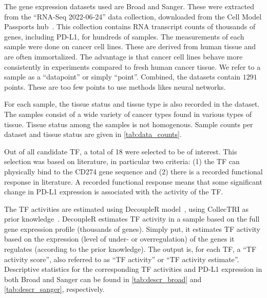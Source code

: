 The gene expression datasets used are Broad and Sanger.
These were extracted from the ``RNA-Seq 2022-06-24'' data collection,
downloaded from the Cell Model Passports hub~\cite{van_der_meer_cell_2019, noauthor_cell_nodate}.
This collection contains RNA transcript counts of thousands of genes, including PD-L1, for hundreds of samples.
The measurements of each sample were done on cancer cell lines.
These are derived from human tissue and are often immortalized.
The advantage is that cancer cell lines behave more consistently in experiments compared to fresh human cancer tissue.
We refer to a sample as a ``datapoint'' or simply ``point''.
Combined, the datasets contain $1291$ points.
These are too few points to use methods likes neural networks.

For each sample, the tissue status and tissue type is also recorded in the dataset.
The samples consist of a wide variety of cancer types found in various types of tissue.
Tissue status among the samples is not homogenous.
Sample counts per dataset and tissue status are given in \autoref{tab:data_counts}.

\begin{table}[h]
    \centering
    
    \caption{Sample counts by dataset and tissue type.}
    \label{tab:data_counts}
\end{table}

Out of all candidate TF, a total of 18 were selected to be of interest.
This selection was based on literature, in particular two criteria:
(1) the TF can physically bind to the CD274 gene sequence and (2)
there is a recorded functional response in literature.
A recorded functional response means that some significant change in PD-L1 expression is associated
with the activity of the TF\@.

The TF activities are estimated using DecoupleR model~\cite{badia-i-mompel_decoupler_2022, badia-i-mompel_transcription_nodate},
using CollecTRI as prior knowledge~\cite{muller-dott_expanding_2023}.
DecoupleR estimates TF activity in a sample based on the full gene expression profile (thousands of genes).
Simply put, it estimates TF activity based on the expression (level of under- or overregulation)
of the genes it regulates (according to the prior knowledge).
The output is, for each TF, a ``TF activity score'', also referred to as ``TF activity'' or ``TF activity estimate''.
Descriptive statistics for the corresponding TF activities and PD-L1 expression in both Broad and Sanger
can be found in \autoref{tab:descr_broad} and \autoref{tab:descr_sanger}, respectively.



